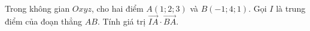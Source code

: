 \begin{ex}
Trong không gian $Oxyz$, cho hai điểm $A(1;2;3)$ và $B(-1;4;1)$. Gọi $I$ là trung điểm của đoạn thẳng $AB$. Tính giá trị $\overrightarrow{IA}\cdot\overrightarrow{BA}$.
\end{ex}
